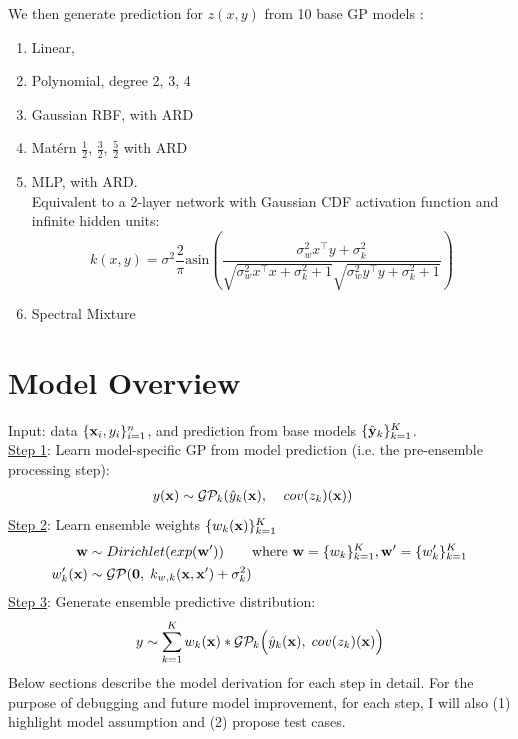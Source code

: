 \documentclass[11pt]{article}
\theoremstyle{definition}
\begin{document}
We then generate prediction for $z(x, y)$ from 10 base GP models \citep{duvenaud_structure_2013}:
\begin{enumerate}
\item Linear, 
\item Polynomial, degree 2, 3, 4
\item Gaussian RBF, with ARD
\item Mat\'{e}rn $\frac{1}{2}$, $\frac{3}{2}$, $\frac{5}{2}$ with ARD
\item MLP, with ARD.\\ 
Equivalent to a 2-layer network with Gaussian CDF activation function and infinite hidden units:
$$k(x,y) = \sigma^{2}\frac{2}{\pi }  \text{asin} \left ( \frac{ \sigma_w^2 x^\top y+\sigma_k^2}{\sqrt{\sigma_w^2x^\top x + \sigma_k^2 + 1}\sqrt{\sigma_w^2 y^\top y + \sigma_k^2 +1}} \right )$$
\item Spectral Mixture \citep{wilson_gaussian_2013}
\end{enumerate} 

\section{\textbf{Model Overview}}
Input: data $\{{\bf x}_i, y_i\}_{i=1}^n$, and prediction from base models $\{\hat{{\bf y}}_k\}_{k=1}^K$.\\
\underline{Step 1}: Learn model-specific GP from model prediction (i.e. the pre-ensemble processing step):
\begin{alignat*}{3}
y({\bf x}) &\sim {\cal G}{\cal P}_k(\hat{y}_k({\bf x}), &&\; cov(z_k)({\bf x})) 
\end{alignat*}
\underline{Step 2}: Learn ensemble weights $\{w_k({\bf x})\}_{k=1}^K$
\begin{alignat*}{3}
{\bf w} &\sim Dirichlet(exp({\bf w}')) \qquad \mbox{where } {\bf w} = \{w_k\}_{k=1}^K, {\bf w}' = \{w'_k\}_{k=1}^K \\
w'_k({\bf x}) & \sim {\cal G}{\cal P}({\bf 0}, \; k_{w,k}({\bf x}, {\bf x}') + \sigma_k^2 )
\end{alignat*}
\underline{Step 3}: Generate ensemble predictive distribution:
\begin{align*}
y &\sim \sum_{k=1}^K w_k({\bf x}) * {\cal G}{\cal P}_k\Big(\hat{y}_k({\bf x}), \; cov(z_k)({\bf x})\Big)\\
\end{align*}
Below sections describe the model derivation for each step in detail. For the purpose of debugging and future model improvement, for each step, I will also (1) highlight model assumption and (2) propose test cases.
\end{document}
